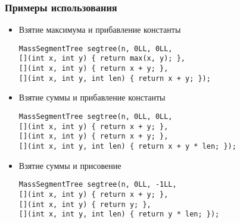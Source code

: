 \subsubsection{Примеры использования}
\begin{itemize}
  \item Взятие максимума и прибавление константы
\begin{lstlisting}
MassSegmentTree segtree(n, 0LL, 0LL,
[](int x, int y) { return max(x, y); },
[](int x, int y) { return x + y; },
[](int x, int y, int len) { return x + y; });
\end{lstlisting}

  \item Взятие суммы и прибавление константы
\begin{lstlisting}
MassSegmentTree segtree(n, 0LL, 0LL,
[](int x, int y) { return x + y; },
[](int x, int y) { return x + y; },
[](int x, int y, int len) { return x + y * len; });
\end{lstlisting}

\item Взятие суммы и присовение
\begin{lstlisting}
MassSegmentTree segtree(n, 0LL, -1LL,
[](int x, int y) { return x + y; },
[](int x, int y) { return y; },
[](int x, int y, int len) { return y * len; });
\end{lstlisting}
\end{itemize}